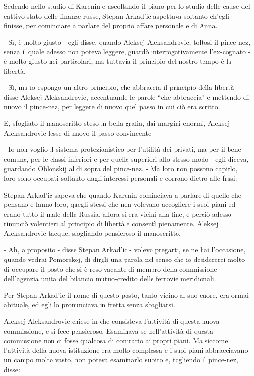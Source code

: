 Sedendo nello studio di Karenin e ascoltando il piano per lo studio delle cause del cattivo stato delle finanze russe, Stepan Arkad'ic aspettava soltanto ch'egli finisse, per cominciare a parlare del proprio affare personale e di Anna. 

- Sì, è molto giusto - egli disse, quando Aleksej Aleksandrovic, toltosi il pince-nez, senza il quale adesso non poteva leggere, guardò interrogativamente l'ex-cognato - è molto giusto nei particolari, ma tuttavia il principio del nostro tempo è la libertà. 

- Sì, ma io espongo un altro principio, che abbraccia il principio della libertà - disse Aleksej Aleksandrovic, accentuando le parole ``che abbraccia'' e mettendo di nuovo il pince-nez, per leggere di nuovo quel passo in cui ciò era scritto. 

E, sfogliato il manoscritto steso in bella grafia, dai margini enormi, Aleksej Aleksandrovic lesse di nuovo il passo convincente. 

- Io non voglio il sistema protezionistico per l'utilità dei privati, ma per il bene comune, per le classi inferiori e per quelle superiori allo stesso modo - egli diceva, guardando Oblonskij al di sopra del pince-nez. - Ma loro non possono capirlo, loro sono occupati soltanto dagli interessi personali e corrono dietro alle frasi. 

Stepan Arkad'ic sapeva che quando Karenin cominciava a parlare di quello che pensano e fanno loro, quegli stessi che non volevano accogliere i suoi piani ed erano tutto il male della Russia, allora si era vicini alla fine, e perciò adesso rinunciò volentieri al principio di libertà e consentì pienamente. Aleksej Aleksandrovic tacque, sfogliando pensieroso il manoscritto. 

- Ah, a proposito - disse Stepan Arkad'ic - volevo pregarti, se ne hai l'occasione, quando vedrai Pomorskoj, di dirgli una parola nel senso che io desidererei molto di occupare il posto che si è reso vacante di membro della commissione dell'agenzia unita del bilancio mutuo-credito delle ferrovie meridionali. 

Per Stepan Arkad'ic il nome di questo posto, tanto vicino al suo cuore, era ormai abituale, ed egli lo pronunciava in fretta senza sbagliarsi. 

Aleksej Aleksandrovic chiese in che consisteva l'attività di questa nuova commissione, e si fece pensieroso. Esaminava se nell'attività di questa commissione non ci fosse qualcosa di contrario ai propri piani. Ma siccome l'attività della nuova istituzione era molto complessa e i suoi piani abbracciavano un campo molto vasto, non poteva esaminarlo subito e, togliendo il pince-nez, disse: 

